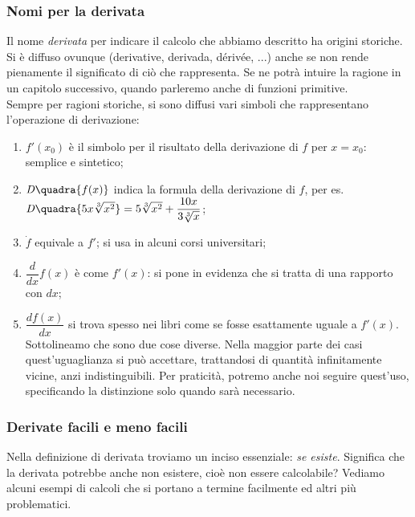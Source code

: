 \subsubsection{Nomi per la derivata}
Il nome \emph{derivata} per indicare il calcolo che abbiamo descritto ha 
origini storiche. Si è diffuso  ovunque (derivative, derivada, dérivée, 
...) 
anche se non rende pienamente il significato di ciò che rappresenta. Se ne 
potrà intuire la ragione in un capitolo successivo, quando parleremo anche 
di
funzioni primitive.\\
Sempre per ragioni storiche, si sono diffusi vari simboli che rappresentano 
l'operazione di derivazione:
\begin{enumerate}[noitemsep]
 \item $f'(x_0)$ è il simbolo per il risultato della derivazione di $f$ 
 per $x= x_0$: semplice e sintetico;
 \item $\mathit{D}\quadra{f(x)}$ indica la formula della derivazione di 
$f$, 
 per es. $\mathit{D}\quadra{5x\sqrt[3]{x^2}}=5\sqrt[3]{x^2}+\dfrac{10x}
 {3\sqrt[3]{x}}$;
 \item $\dot{f}$ equivale a $f'$; si usa in alcuni corsi universitari;
 \item $\dfrac{d}{dx}f(x)$ è come $f'(x)$: si pone in evidenza che si 
tratta 
 di una rapporto con $dx$;
 \item $\dfrac{df(x)}{dx}$ si trova spesso nei libri come se fosse 
esattamente 
 uguale a $f'(x)$. Sottolineamo che sono due cose diverse.  
 Nella maggior parte dei casi quest'uguaglianza si può accettare, 
trattandosi 
 di quantità infinitamente vicine, anzi indistinguibili. Per praticità, 
potremo
 anche noi seguire quest'uso, specificando la distinzione solo quando sarà 
 necessario.
\end{enumerate}

\subsubsection{Derivate facili e meno facili}
Nella definizione di derivata troviamo un inciso essenziale: \emph{se 
esiste}.
Significa che la derivata potrebbe anche non esistere, cioè non essere 
calcolabile? Vediamo alcuni esempi di calcoli che si portano a termine 
facilmente 
ed altri più problematici.

